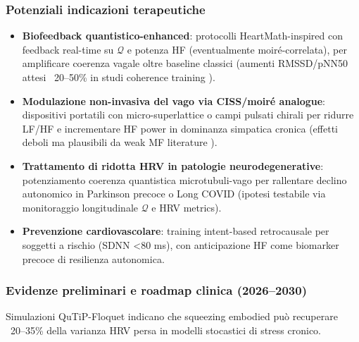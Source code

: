 \documentclass[11pt,a4paper]{article}
\let\oldcite\cite
\renewcommand{\cite}{\protect\oldcite}
\theoremstyle{plain}
\theoremstyle{definition}
\begin{document}
\clearpage


\subsubsection{Potenziali indicazioni terapeutiche}

\begin{itemize}
    \item \textbf{Biofeedback quantistico-enhanced}: protocolli HeartMath-inspired con feedback real-time su $\mathcal{Q}$ e potenza HF (eventualmente moiré-correlata), per amplificare coerenza vagale oltre baseline classici (aumenti RMSSD/pNN50 attesi ~20--50\% in studi coherence training \cite{McCraty2025coherence, Elbers2025dysregulation}).
    \item \textbf{Modulazione non-invasiva del vago via CISS/moiré analogue}: dispositivi portatili con micro-superlattice o campi pulsati chirali per ridurre LF/HF e incrementare HF power in dominanza simpatica cronica (effetti deboli ma plausibili da weak MF literature 
    \cite{Mansourian2023EMFmeta}).

    \vspace{0.2cm}
    \item \textbf{Trattamento di ridotta HRV in patologie neurodegenerative}: potenziamento coerenza quantistica microtubuli-vago per rallentare declino autonomico in Parkinson precoce o Long COVID (ipotesi testabile via monitoraggio longitudinale $\mathcal{Q}$ e HRV metrics).

    \vspace{0.2cm}
    \item \textbf{Prevenzione cardiovascolare}: training intent-based retrocausale per soggetti a rischio (SDNN <80 ms), con anticipazione HF come biomarker precoce di resilienza autonomica.
\end{itemize}


\vspace{0.3cm}

\subsubsection{Evidenze preliminari e roadmap clinica (2026--2030)}


\vspace{0.2cm}

Simulazioni QuTiP-Floquet indicano che squeezing embodied può recuperare ~20--35\% della varianza HRV persa in modelli stocastici di stress cronico. 

\vspace{0.2cm}
\end{document}
